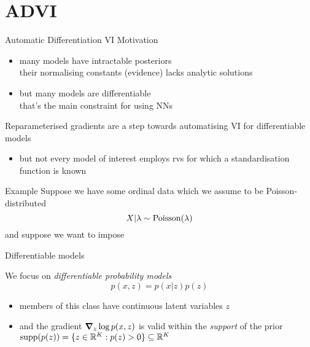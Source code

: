 \documentclass[14pt,dvipsnames]{beamer}
\begin{document}
\section{ADVI}

\begin{frame}{Automatic Differentiation VI}
	Motivation
	\begin{itemize}
		\item many models have intractable posteriors\\
		their normalising constants (evidence) lacks analytic solutions \pause
		\item but many models are differentiable\\
		that's the main constraint for using NNs \pause
	\end{itemize}

	Reparameterised gradients are a step towards automatising VI for differentiable models \pause
	\begin{itemize}
		\item but not every model of interest employs rvs for which a standardisation function is known
	\end{itemize}
	
\end{frame}

\begin{frame}{Example}
	Suppose we have some ordinal data which we assume to be Poisson-distributed
	\begin{equation*}
		X|\lambda \sim \operatorname{Poisson}(\lambda)
	\end{equation*}
	and suppose we want to impose 
\end{frame}

\begin{frame}{Differentiable models}

	We focus on \emph{differentiable probability models}
	\begin{equation*}
		p(x,z) = p(x|z)p(z)
	\end{equation*}
	\pause
	\begin{itemize}
		\item members of this class have continuous latent variables $z$\\ \pause
		\item and the gradient $\grad_z \log p(x,z)$ is valid within the \emph{support} of the prior 
		$\operatorname{supp}(p(z)) = \{ z \in \mathbb R^K : p(z) > 0 \} \subseteq \mathbb R^K$
	\end{itemize}
	
\end{frame}
\end{document}

